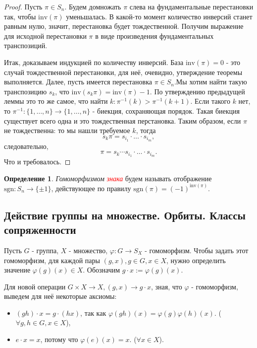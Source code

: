 \documentclass[a4paper,100pt]{article}
\theoremstyle{indented}
\theoremstyle{definition}
\newtheorem{defn}{Определение}
\theoremstyle{remark}
\begin{document}
\begin{proof}
    Пусть $\pi\in S_n$. Будем домножать $\pi$ слева на фундаментальные перестановки так, чтобы $\text{inv}(\pi)$ уменьшалась. В какой-то момент количество инверсий станет равным нулю, значит, перестановка будет тождественной. Получим выражение для исходной перестановки $\pi$ в виде произведения фундаментальных транспозиций. \ 

    Итак, доказываем индукцией по количеству инверсий. База $\text{inv}(\pi)=0$ - это случай тождественной перестановки, для неё, очевидно, утверждение теоремы выполняется. Далее, пусть имеется перестановка $\pi\in S_n$.Мы хотим найти такую транспозицию $s_k$, что $\text{inv}(s_k\pi)=\text{inv}(\pi)-1$. По утверждению предыдущей леммы это то же самое, что найти $k:\pi^{-1}(k)>\pi^{-1}(k+1)$. Если такого $k$ нет, то $\pi^{-1}:\{1, \dots, n\}\rightarrow\{1, \dots, n\}$ - биекция, сохраняющая порядок. Такая биекция существует всего одна и это тождественная перстановка. Таким образом, если $\pi$ не тождественна: то мы нашли требуемое $k$, тогда
    \[
        s_k\pi=s_{i_1}\cdot\dots\cdot s_{i_m},
    \]
    следовательно, 
    \[
        \pi=s_k\cdots s_{i_1}\cdot\dots\cdot s_{i_m}.
    \]
    Что и требовалось.
\end{proof}

\begin{defn}
    \textit{Гомоморфизмом} \hypertarget{n77}{\textcolor{red}{\textit{знака}}} будем называть отображение $\text{sgn}: S_n\rightarrow \{±1\}$, действующее по правилу $\text{sgn}(\pi)=(-1)^{\text{inv}(\pi)}$.
\end{defn}

\resetall

\subsection{Действие группы на множестве. Орбиты. Классы сопряженности}

Пусть $G$ - группа, $X$ - множество, $\varphi :G\rightarrow S_X$ - гомоморфизм. Чтобы задать этот гомоморфизм, для каждой пары $(g, x), g\in G, x\in X$, нужно определить значение $\varphi (g)(x)\in X$. Обозначим $g\cdot x:=\varphi(g)(x)$. \ 

Для новой операции $G\times X\rightarrow X, (g, x)\rightarrow g\cdot x$, зная, что $\varphi$ - гомоморфизм, выведем для неё некоторые аксиомы: \ 

\begin{itemize}
    \item $(gh)\cdot x=g\cdot (hx)$, так как $\varphi (gh)(x)=\varphi(g)\varphi(h)(x)$. ($\forall g, h\in G, x\in X$), 
    \item $e\cdot x=x$, потому что $\varphi(e)(x)=x$. ($\forall x\in X$).
\end{itemize}
\end{document}
